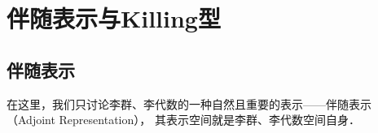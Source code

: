 





\section{伴随表示与Killing型}
\subsection{伴随表示}\label{chlg:sec_adjoint}
在这里，我们只讨论李群、李代数的一种自然且重要的表示——伴随表示（Adjoint Representation），
其表示空间就是李群、李代数空间自身．


